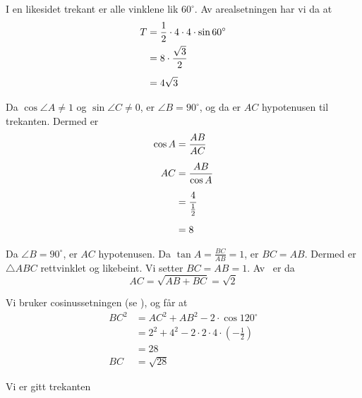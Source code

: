 

I en likesidet trekant er alle vinklene lik $60^\circ$. Av arealsetningen har vi da at
\begin{align*}
	T &= \frac{1}{2}\cdot4\cdot4\cdot\sin 60^\circ \\
	&= 8\cdot\frac{\sqrt{3}}{2} \br
	&= 4\sqrt{3}
\end{align*}

Da $\cos \angle A\neq 1$ og $\sin \angle C\neq 0$, er $\angle B=90^\circ$, og da er $AC$ hypotenusen til trekanten. Dermed er
\begin{align*}
	\cos A &= \frac{AB}{AC}\br
	AC &= \frac{AB}{\cos A} \br
	&= \frac{4}{\frac{1}{2}} \br
	&= 8
\end{align*}

Da $\angle B=90^\circ$, er $AC$ hypotenusen. Da $\tan A = \frac{BC}{AB}=1$, er $BC=AB$. Dermed er $\triangle ABC$ rettvinklet og likebeint. Vi setter $BC=AB=1$. Av \pyt\ er da
\[ AC=\sqrt{AB+BC}=\sqrt{2} \]

Vi bruker cosinussetningen (se ), og får at
\begin{align*}
	BC^2 &= AC^2+AB^2 -2\cdot\cos 120^\circ \\
	&= 2^2+4^2-2\cdot2\cdot4\cdot\left(-\frac{1}{2}\right) \\
	&= 28\\
	BC &= \sqrt{28}
\end{align*}

\newpage
{}
Vi er gitt trekanten


